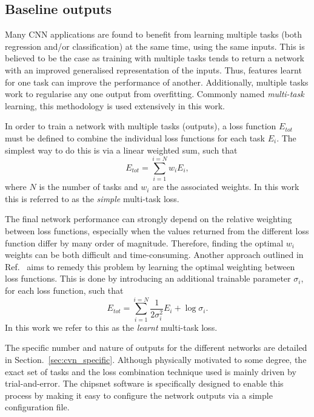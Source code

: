\subsection{Baseline outputs} %
\label{sec:cvn_baseline_outputs} %

Many CNN applications are found to benefit from learning multiple tasks (both regression and/or
classification) at the same time, using the same inputs. This is believed to be the case as
training with multiple tasks tends to return a network with an improved generalised representation
of the inputs. Thus, features learnt for one task can improve the performance of another.
Additionally, multiple tasks work to regularise any one output from overfitting. Commonly named
\emph{multi-task} learning, this methodology is used extensively in this work.

In order to train a network with multiple tasks (outputs), a loss function $E_{tot}$ must be
defined to combine the individual loss functions for each task $E_{i}$. The simplest way to do
this is via a linear weighted sum, such that
\begin{equation}
    E_{tot} = \sum_{i=1}^{i=N}w_{i}E_{i},
    \label{eq:multi_simple}
\end{equation}
where $N$ is the number of tasks and $w_{i}$ are the associated weights. In this work this is
referred to as the \emph{simple} multi-task loss.

The final network performance can strongly depend on the relative weighting between loss
functions, especially when the values returned from the different loss function differ by many
order of magnitude. Therefore, finding the optimal $w_{i}$ weights can be both difficult and
time-consuming. Another approach outlined in Ref.~\cite{kendall2018} aims to remedy this problem
by learning the optimal weighting between loss functions. This is done by introducing an
additional trainable parameter $\sigma_{i}$, for each loss function, such that
\begin{equation}
    E_{tot}= \sum_{i=1}^{i=N}\frac{1}{2\sigma_{i}^2}E_{i}+ \log\sigma_{i}.
    \label{eq:multi_learnt}
\end{equation}
In this work we refer to this as the \emph{learnt} multi-task loss.

The specific number and nature of outputs for the different networks are detailed in
Section.~\ref{sec:cvn_specific}. Although physically motivated to some degree, the exact set of
tasks and the loss combination technique used is mainly driven by trial-and-error. The chipsnet
software is specifically designed to enable this process by making it easy to configure the
network outputs via a simple configuration file.

